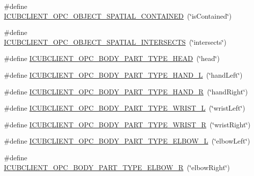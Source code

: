 \begin{DoxyCompactItemize}
\item 
\#define \hyperlink{group__icubclient__tags_ga559cfa30a899e732b37ffaa7c3c9a3b2}{I\+C\+U\+B\+C\+L\+I\+E\+N\+T\+\_\+\+O\+P\+C\+\_\+\+O\+B\+J\+E\+C\+T\+\_\+\+S\+P\+A\+T\+I\+A\+L\+\_\+\+C\+O\+N\+T\+A\+I\+N\+ED}~(\char`\"{}is\+Contained\char`\"{})
\item 
\#define \hyperlink{group__icubclient__tags_ga6c1db51a1a49b4f6f5e4f8b4521fef4b}{I\+C\+U\+B\+C\+L\+I\+E\+N\+T\+\_\+\+O\+P\+C\+\_\+\+O\+B\+J\+E\+C\+T\+\_\+\+S\+P\+A\+T\+I\+A\+L\+\_\+\+I\+N\+T\+E\+R\+S\+E\+C\+TS}~(\char`\"{}intersects\char`\"{})
\item 
\#define \hyperlink{group__icubclient__tags_gaa02aa07eae126204dbe8b5c2af195d32}{I\+C\+U\+B\+C\+L\+I\+E\+N\+T\+\_\+\+O\+P\+C\+\_\+\+B\+O\+D\+Y\+\_\+\+P\+A\+R\+T\+\_\+\+T\+Y\+P\+E\+\_\+\+H\+E\+AD}~(\char`\"{}head\char`\"{})
\item 
\#define \hyperlink{group__icubclient__tags_gacaaedb258ff7e0352008bc9e40b798ca}{I\+C\+U\+B\+C\+L\+I\+E\+N\+T\+\_\+\+O\+P\+C\+\_\+\+B\+O\+D\+Y\+\_\+\+P\+A\+R\+T\+\_\+\+T\+Y\+P\+E\+\_\+\+H\+A\+N\+D\+\_\+L}~(\char`\"{}hand\+Left\char`\"{})
\item 
\#define \hyperlink{group__icubclient__tags_gae2b60e6d7fdc2446affb4e12c9dc2a48}{I\+C\+U\+B\+C\+L\+I\+E\+N\+T\+\_\+\+O\+P\+C\+\_\+\+B\+O\+D\+Y\+\_\+\+P\+A\+R\+T\+\_\+\+T\+Y\+P\+E\+\_\+\+H\+A\+N\+D\+\_\+R}~(\char`\"{}hand\+Right\char`\"{})
\item 
\#define \hyperlink{group__icubclient__tags_gaeba18fe718ae272c328d8a7be81fe82e}{I\+C\+U\+B\+C\+L\+I\+E\+N\+T\+\_\+\+O\+P\+C\+\_\+\+B\+O\+D\+Y\+\_\+\+P\+A\+R\+T\+\_\+\+T\+Y\+P\+E\+\_\+\+W\+R\+I\+S\+T\+\_\+L}~(\char`\"{}wrist\+Left\char`\"{})
\item 
\#define \hyperlink{group__icubclient__tags_ga56da7b9d06ef0ff7b65e2d6a87be20f5}{I\+C\+U\+B\+C\+L\+I\+E\+N\+T\+\_\+\+O\+P\+C\+\_\+\+B\+O\+D\+Y\+\_\+\+P\+A\+R\+T\+\_\+\+T\+Y\+P\+E\+\_\+\+W\+R\+I\+S\+T\+\_\+R}~(\char`\"{}wrist\+Right\char`\"{})
\item 
\#define \hyperlink{group__icubclient__tags_gab86fd7975a074ae0200fc921f24b8b27}{I\+C\+U\+B\+C\+L\+I\+E\+N\+T\+\_\+\+O\+P\+C\+\_\+\+B\+O\+D\+Y\+\_\+\+P\+A\+R\+T\+\_\+\+T\+Y\+P\+E\+\_\+\+E\+L\+B\+O\+W\+\_\+L}~(\char`\"{}elbow\+Left\char`\"{})
\item 
\#define \hyperlink{group__icubclient__tags_ga97554fb72caba6d7bd4e545d989ce838}{I\+C\+U\+B\+C\+L\+I\+E\+N\+T\+\_\+\+O\+P\+C\+\_\+\+B\+O\+D\+Y\+\_\+\+P\+A\+R\+T\+\_\+\+T\+Y\+P\+E\+\_\+\+E\+L\+B\+O\+W\+\_\+R}~(\char`\"{}elbow\+Right\char`\"{})
\item 

\end{DoxyCompactItemize}
